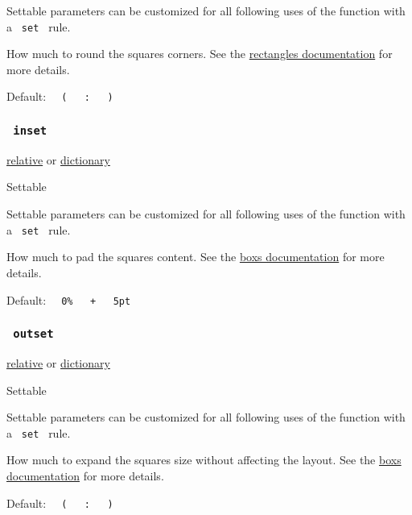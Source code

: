 \label{parameters-radius-settable-tooltip}
Settable parameters can be customized for all following uses of the
function with a \texttt{\ set\ } rule.

How much to round the square\textquotesingle s corners. See the
\href{/docs/reference/visualize/rect/\#parameters-radius}{rectangle\textquotesingle s
documentation} for more details.

Default:
\texttt{\ }{\texttt{\ (\ }}\texttt{\ }{\texttt{\ :\ }}\texttt{\ }{\texttt{\ )\ }}\texttt{\ }

\subsubsection{\texorpdfstring{\texttt{\ inset\ }}{ inset }}\label{parameters-inset}

\href{/docs/reference/layout/relative/}{relative} {or}
\href{/docs/reference/foundations/dictionary/}{dictionary}

{{ Settable }}

\label{parameters-inset-settable-tooltip}
Settable parameters can be customized for all following uses of the
function with a \texttt{\ set\ } rule.

How much to pad the square\textquotesingle s content. See the
\href{/docs/reference/layout/box/\#parameters-inset}{box\textquotesingle s
documentation} for more details.

Default:
\texttt{\ }{\texttt{\ 0\%\ }}\texttt{\ }{\texttt{\ +\ }}\texttt{\ }{\texttt{\ 5pt\ }}\texttt{\ }

\subsubsection{\texorpdfstring{\texttt{\ outset\ }}{ outset }}\label{parameters-outset}

\href{/docs/reference/layout/relative/}{relative} {or}
\href{/docs/reference/foundations/dictionary/}{dictionary}

{{ Settable }}

\label{parameters-outset-settable-tooltip}
Settable parameters can be customized for all following uses of the
function with a \texttt{\ set\ } rule.

How much to expand the square\textquotesingle s size without affecting
the layout. See the
\href{/docs/reference/layout/box/\#parameters-outset}{box\textquotesingle s
documentation} for more details.

Default:
\texttt{\ }{\texttt{\ (\ }}\texttt{\ }{\texttt{\ :\ }}\texttt{\ }{\texttt{\ )\ }}\texttt{\ }

